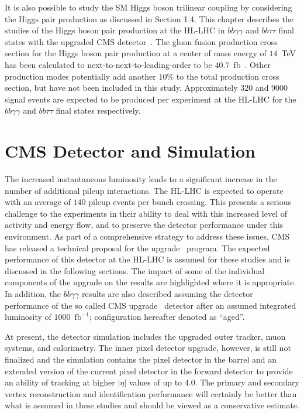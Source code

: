 It is also possible to study the SM Higgs boson trilinear coupling by considering the Higgs pair production as discussed in Section 1.4. This chapter describes the studies of the Higgs boson pair production at the HL-LHC in $bb\gamma\gamma$ and $bb\tau\tau$ final states with the upgraded CMS detector~\cite{CMS-PAS-FTR-15-002}. The gluon fusion production cross section for the Higgs boson pair production at a center of mass energy of $14$~TeV has been calculated to next-to-next-to-leading-order to be $40.7$~fb~\cite{Dawson:1998py,Grigo:2014jma}. Other production modes potentially add another $10\%$ to the total production cross section, but have not been included in this study. Approximately $320$ and  $9000$ signal events are expected to be produced per experiment at the HL-LHC for the $bb\gamma\gamma$ and $bb\tau\tau$ final states respectively.

\section{CMS \phasetwo Detector and Simulation}

The increased instantaneous luminosity leads to a significant increase in the number of additional pileup interactions. The HL-LHC is expected to operate with an average of $140$ pileup events per bunch crossing. This presents a serious challenge to the experiments in their ability to deal with this increased level of activity and energy flow, and to preserve the detector performance under this environment.  As part of a comprehensive strategy to address these issues, CMS has released a technical proposal for the \phasetwo upgrade~\cite{Butler:2020886} program. The expected performance of this detector at the HL-LHC is assumed for these studies and is discussed in the following sections. The impact of some of the individual components of the \phasetwo upgrade on the results are highlighted where it is appropriate. In addition, the $bb\gamma\gamma$ results are also described assuming the detector performance of the so called \phaseone CMS upgrade~\cite{Collaboration:1355706} detector after an assumed integrated luminosity of $1000$~$\mathrm{fb}^{-1}$; configuration hereafter denoted as ``\phaseone aged''.

At present, the \phasetwo detector simulation includes the upgraded outer tracker, muon systems, and calorimetry. The inner pixel detector upgrade, however, is still not finalized and the simulation contains the \phaseone pixel detector in the barrel and an extended version of the current pixel detector in the forward detector to provide an ability of tracking at higher $|\eta|$ values of up to $4.0$. The primary and secondary vertex reconstruction and identification performance will certainly be better than what is assumed in these studies and should be viewed as a conservative estimate.


